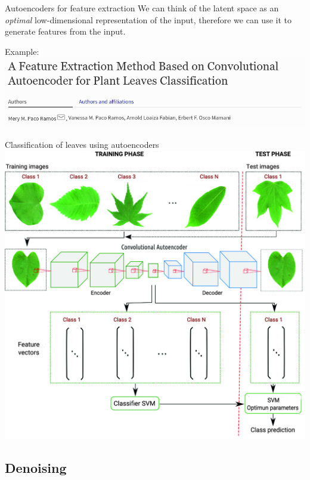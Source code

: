 \documentclass[9pt, aspectratio=169]{beamer}
\begin{document}
\begin{frame}
    {Autoencoders for feature extraction}
    We can think of the latent space as an \textit{optimal} low-dimensional representation of the input, therefore we can use it to generate features from the input.

    \pause
    Example:
    \centering
    \includegraphics[width=\textwidth]{paco ramos.png}
\end{frame}

\begin{frame}
    {Classification of leaves using autoencoders}
    \centering
    \includegraphics[height=.9\textheight]{paco ramos 2019 method.png}
\end{frame}

\subsection{Denoising}
\end{document}
